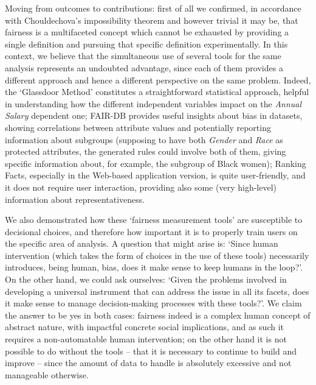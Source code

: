 Moving from outcomes to contributions: first of all we confirmed, in accordance with Chouldechova's impossibility theorem \cite{chouldechova2017fair} and however trivial it may be, that fairness is a multifaceted concept which cannot be exhausted by providing a single definition and pursuing that specific definition experimentally. In this context, we believe that the simultaneous use of several tools for the same analysis represents an undoubted advantage, since each of them provides a different approach and hence a different perspective on the same problem. Indeed, the `Glassdoor Method' constitutes a straightforward statistical approach, helpful in understanding how the different independent variables impact on the \textit{Annual Salary} dependent one; FAIR-DB provides useful insights about bias in datasets, showing correlations between attribute values and potentially reporting information about subgroups (supposing to have both \textit{Gender} and \textit{Race} as protected attributes, the generated rules could involve both of them, giving specific information about, for example, the subgroup of Black women); Ranking Facts, especially in the Web-based application version, is quite user-friendly, and it does not require user interaction, providing also some (very high-level) information about representativeness.

We also demonstrated how these `fairness measurement tools' are susceptible to decisional choices, and therefore how important it is to properly train users on the specific area of analysis. A question that might arise is: `Since human intervention (which takes the form of choices in the use of these tools) necessarily introduces, being human, bias, does it make sense to keep humans in the loop?'. On the other hand, we could ask ourselves: `Given the problems involved in developing a universal instrument that can address the issue in all its facets, does it make sense to manage decision-making processes with these tools?'. We claim the answer to be yes in both cases: fairness indeed is a complex human concept of abstract nature, with impactful concrete social implications, and as such it requires a non-automatable human intervention; on the other hand it is not possible to do without the tools -- that it is necessary to continue to build and improve -- since the amount of data to handle is absolutely excessive and not manageable otherwise.

